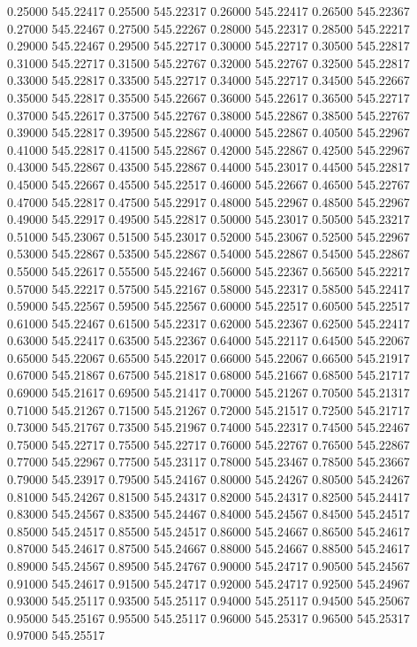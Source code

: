 {0.25000 545.22417
0.25500 545.22317
0.26000 545.22417
0.26500 545.22367
0.27000 545.22467
0.27500 545.22267
0.28000 545.22317
0.28500 545.22217
0.29000 545.22467
0.29500 545.22717
0.30000 545.22717
0.30500 545.22817
0.31000 545.22717
0.31500 545.22767
0.32000 545.22767
0.32500 545.22817
0.33000 545.22817
0.33500 545.22717
0.34000 545.22717
0.34500 545.22667
0.35000 545.22817
0.35500 545.22667
0.36000 545.22617
0.36500 545.22717
0.37000 545.22617
0.37500 545.22767
0.38000 545.22867
0.38500 545.22767
0.39000 545.22817
0.39500 545.22867
0.40000 545.22867
0.40500 545.22967
0.41000 545.22817
0.41500 545.22867
0.42000 545.22867
0.42500 545.22967
0.43000 545.22867
0.43500 545.22867
0.44000 545.23017
0.44500 545.22817
0.45000 545.22667
0.45500 545.22517
0.46000 545.22667
0.46500 545.22767
0.47000 545.22817
0.47500 545.22917
0.48000 545.22967
0.48500 545.22967
0.49000 545.22917
0.49500 545.22817
0.50000 545.23017
0.50500 545.23217
0.51000 545.23067
0.51500 545.23017
0.52000 545.23067
0.52500 545.22967
0.53000 545.22867
0.53500 545.22867
0.54000 545.22867
0.54500 545.22867
0.55000 545.22617
0.55500 545.22467
0.56000 545.22367
0.56500 545.22217
0.57000 545.22217
0.57500 545.22167
0.58000 545.22317
0.58500 545.22417
0.59000 545.22567
0.59500 545.22567
0.60000 545.22517
0.60500 545.22517
0.61000 545.22467
0.61500 545.22317
0.62000 545.22367
0.62500 545.22417
0.63000 545.22417
0.63500 545.22367
0.64000 545.22117
0.64500 545.22067
0.65000 545.22067
0.65500 545.22017
0.66000 545.22067
0.66500 545.21917
0.67000 545.21867
0.67500 545.21817
0.68000 545.21667
0.68500 545.21717
0.69000 545.21617
0.69500 545.21417
0.70000 545.21267
0.70500 545.21317
0.71000 545.21267
0.71500 545.21267
0.72000 545.21517
0.72500 545.21717
0.73000 545.21767
0.73500 545.21967
0.74000 545.22317
0.74500 545.22467
0.75000 545.22717
0.75500 545.22717
0.76000 545.22767
0.76500 545.22867
0.77000 545.22967
0.77500 545.23117
0.78000 545.23467
0.78500 545.23667
0.79000 545.23917
0.79500 545.24167
0.80000 545.24267
0.80500 545.24267
0.81000 545.24267
0.81500 545.24317
0.82000 545.24317
0.82500 545.24417
0.83000 545.24567
0.83500 545.24467
0.84000 545.24567
0.84500 545.24517
0.85000 545.24517
0.85500 545.24517
0.86000 545.24667
0.86500 545.24617
0.87000 545.24617
0.87500 545.24667
0.88000 545.24667
0.88500 545.24617
0.89000 545.24567
0.89500 545.24767
0.90000 545.24717
0.90500 545.24567
0.91000 545.24617
0.91500 545.24717
0.92000 545.24717
0.92500 545.24967
0.93000 545.25117
0.93500 545.25117
0.94000 545.25117
0.94500 545.25067
0.95000 545.25167
0.95500 545.25117
0.96000 545.25317
0.96500 545.25317
0.97000 545.25517
}
